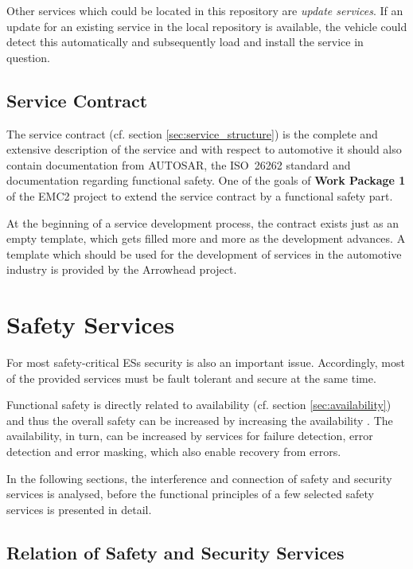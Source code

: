 Other services which could be located in this repository are \emph{update services}. If an update for an existing service in the local repository is available, the vehicle could detect this automatically and subsequently load and install the service in question.


\subsection{Service Contract}

The service contract (cf. section \ref{sec:service_structure}) is the complete and extensive description of the service and with respect to automotive it should also contain documentation from AUTOSAR, the \mbox{ISO 26262} standard and documentation regarding functional safety. One of the goals of \textbf{Work Package 1} of the EMC2 project to extend the service contract by a functional safety part.

At the beginning of a service development process, the contract exists just as an empty template, which gets filled more and more as the development advances. A template which should be used for the development of services in the automotive industry is provided by the Arrowhead project.











\section{Safety Services}

For most safety-critical ESs security is also an important issue. Accordingly, most of the provided services must be fault tolerant and secure at the same time.

Functional safety is directly related to availability (cf. section \ref{sec:availability}) and thus the overall safety can be increased by increasing the availability \cite{turek2011}. The availability, in turn, can be increased by services for failure detection, error detection and error masking, which also enable recovery from errors.

In the following sections, the interference and connection of safety and security services is analysed, before the functional principles of a few selected safety services is presented in detail.

\subsection{Relation of Safety and Security Services}


